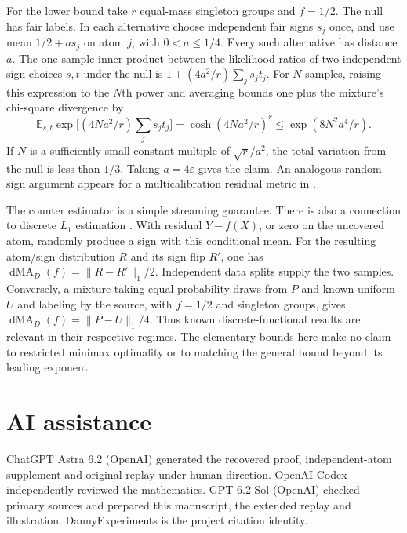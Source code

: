 \documentclass[11pt,a4paper]{amsart}
\newcommand{\E}{\mathbb E}
\newcommand{\dMA}{\operatorname{dMA}}
\begin{document}
For the lower bound take $r$ equal-mass singleton groups and $f=1/2$. The null has fair labels. In each alternative choose independent fair signs $s_j$ once, and use mean $1/2+a s_j$ on atom $j$, with $0<a\leq1/4$. Every such alternative has distance $a$. The one-sample inner product between the likelihood ratios of two independent sign choices $s,t$ under the null is $1+(4a^2/r)\sum_j s_jt_j$. For $N$ samples, raising this expression to the $N$th power and averaging bounds one plus the mixture's chi-square divergence by
\[
 \E_{s,t}\exp\bigl[(4Na^2/r)\textstyle\sum_j s_jt_j\bigr]
    =\cosh(4Na^2/r)^r\leq\exp(8N^2a^4/r).
\]
If $N$ is a sufficiently small constant multiple of $\sqrt r/a^2$, the total variation from the null is less than $1/3$. Taking $a=4\varepsilon$ gives the claim. An analogous random-sign argument appears for a multicalibration residual metric in \cite[\S5.4]{okoroafor}.

The counter estimator is a simple streaming guarantee. There is also a connection to discrete $L_1$ estimation \cite{jiao}. With residual $Y-f(X)$, or zero on the uncovered atom, randomly produce a sign with this conditional mean. For the resulting atom/sign distribution $R$ and its sign flip $R'$, one has $\dMA_D(f)=\|R-R'\|_1/2$. Independent data splits supply the two samples. Conversely, a mixture taking equal-probability draws from $P$ and known uniform $U$ and labeling by the source, with $f=1/2$ and singleton groups, gives $\dMA_D(f)=\|P-U\|_1/4$. Thus known discrete-functional results are relevant in their respective regimes. The elementary bounds here make no claim to restricted minimax optimality or to matching the general bound beyond its leading exponent.

\section*{AI assistance}
ChatGPT Astra 6.2 (OpenAI) generated the recovered proof, independent-atom supplement and original replay under human direction. OpenAI Codex independently reviewed the mathematics. GPT-6.2 Sol (OpenAI) checked primary sources and prepared this manuscript, the extended replay and illustration. DannyExperiments is the project citation identity.



\end{document}
